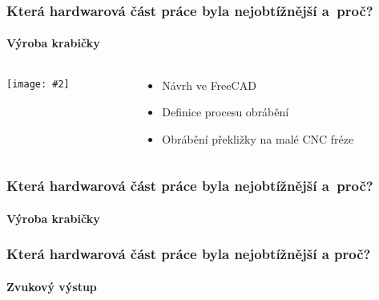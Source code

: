 \documentclass[
    utf8,
    aspectratio=169,
    17pt,  %
]{beamer}
\newcommand{\fullsizegraphics}[2][]{%
    \centering%
    \texttt{[image: \#2]}%
}
\begin{document}
\begin{frame}[fragile]  %
    \frametitle{Která hardwarová část práce byla nejobtížnější a~proč?}
    \framesubtitle{Výroba krabičky}
    \begin{columns}
        \begin{column}{0.5\textwidth}
            \fullsizegraphics[bb=0px 430px 2200px 1918px, clip]{final-front}
        \end{column}
        \begin{column}{0.5\textwidth}
            \begin{itemize}
                \item Návrh ve FreeCAD
                \item Definice procesu obrábění
                \item Obrábění překližky na malé CNC fréze
            \end{itemize}
        \end{column}
    \end{columns}
\end{frame}

\begin{frame}
    \frametitle{Která hardwarová část práce byla nejobtížnější a~proč?}
    \framesubtitle{Výroba krabičky}
    \only<1>{\fullsizegraphics{krabicka-CNC-repro}}
    \only<2>{\fullsizegraphics{krabicka-CNC-laser}}
    \only<3>{\fullsizegraphics{krabicka-CNC-poskozeni}}
\end{frame}


\begin{frame}
    \frametitle{Která hardwarová část práce byla nejobtížnější a proč?}
    \framesubtitle{Zvukový výstup}
    \only<2>{\fullsizegraphics{zvuk-stul1}}
    \only<3>{\fullsizegraphics{zvuk-stul2}}
\end{frame}
\end{document}
